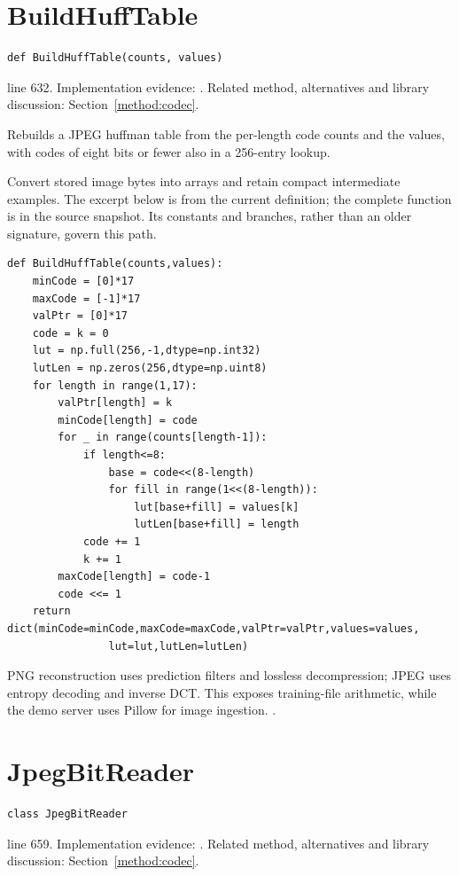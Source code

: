 \section{BuildHuffTable}\label{fn:train:BuildHuffTable}
\begin{lstlisting}[style=sig]
def BuildHuffTable(counts, values)
\end{lstlisting}
 line 632. Implementation evidence: \cite{code2026}. Related method, alternatives and library discussion: Section~\ref{method:codec}.


Rebuilds a JPEG huffman table from the per-length code counts and the values, with codes of eight bits or fewer also in a 256-entry lookup.


Convert stored image bytes into arrays and retain compact intermediate examples. The excerpt below is from the current definition; the complete function is in the source snapshot. Its constants and branches, rather than an older signature, govern this path.


\begin{lstlisting}[style=plain]
def BuildHuffTable(counts,values):
    minCode = [0]*17
    maxCode = [-1]*17
    valPtr = [0]*17
    code = k = 0
    lut = np.full(256,-1,dtype=np.int32)
    lutLen = np.zeros(256,dtype=np.uint8)
    for length in range(1,17):
        valPtr[length] = k
        minCode[length] = code
        for _ in range(counts[length-1]):
            if length<=8:
                base = code<<(8-length)
                for fill in range(1<<(8-length)):
                    lut[base+fill] = values[k]
                    lutLen[base+fill] = length
            code += 1
            k += 1
        maxCode[length] = code-1
        code <<= 1
    return dict(minCode=minCode,maxCode=maxCode,valPtr=valPtr,values=values,
                lut=lut,lutLen=lutLen)
\end{lstlisting}
PNG reconstruction uses prediction filters and lossless decompression; JPEG uses entropy decoding and inverse DCT. This exposes training-file arithmetic, while the demo server uses Pillow for image ingestion. \cite{pngspec,jpegspec,pillowimage}.


\section{JpegBitReader}\label{fn:train:JpegBitReader}
\begin{lstlisting}[style=sig]
class JpegBitReader
\end{lstlisting}
 line 659. Implementation evidence: \cite{code2026}. Related method, alternatives and library discussion: Section~\ref{method:codec}.


